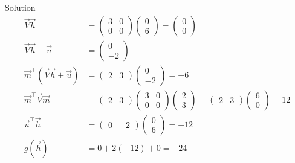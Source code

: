 \documentclass{beamer}
\begin{document}
 \begin{frame}{Solution}
     \begin{align}
         \vec{V}\vec{h} &= \begin{pmatrix} 3 & 0 \\ 0 & 0 \end{pmatrix}
\begin{pmatrix} 0 \\ 6 \end{pmatrix} = \begin{pmatrix} 0 \\ 0 \end{pmatrix} \\
\vec{V}\vec{h} + \vec{u} &= \begin{pmatrix} 0 \\ -2 \end{pmatrix} \\
\vec{m}^\top (\vec{V}\vec{h} + \vec{u}) &= 
\begin{pmatrix} 2 & 3 \end{pmatrix} \begin{pmatrix} 0 \\ -2 \end{pmatrix} 
= -6 \\
\vec{m}^\top \vec{V} \vec{m} &= 
\begin{pmatrix} 2 & 3 \end{pmatrix} 
\begin{pmatrix} 3 & 0 \\ 0 & 0 \end{pmatrix} 
\begin{pmatrix} 2 \\ 3 \end{pmatrix} = 
\begin{pmatrix} 2 & 3 \end{pmatrix} \begin{pmatrix} 6 \\ 0 \end{pmatrix} = 12 \\
\vec{u}^\top \vec{h} &= 
\begin{pmatrix} 0 & -2 \end{pmatrix} \begin{pmatrix} 0 \\ 6 \end{pmatrix} = -12 \\
g(\vec{h}) &= 0 + 2(-12) + 0 = -24
     \end{align}
 \end{frame}
\end{document}
